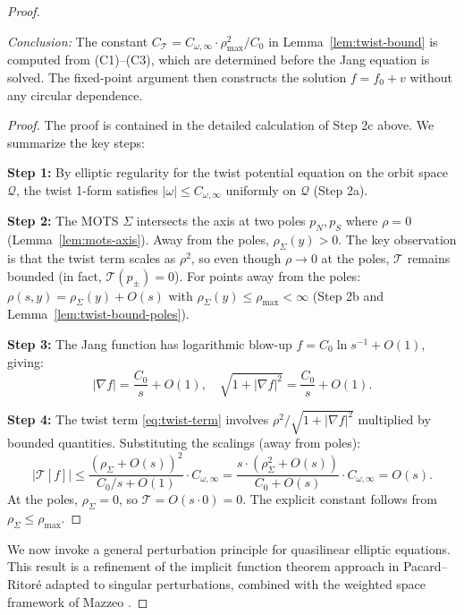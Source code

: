 \begin{proof}
\begin{lemma}
\textit{Conclusion:} The constant $C_\mathcal{T} = C_{\omega,\infty} \cdot \rho_{\max}^2 / C_0$ in Lemma~\ref{lem:twist-bound} is computed from (C1)--(C3), which are determined before the Jang equation is solved. The fixed-point argument then constructs the solution $f = f_0 + v$ without any circular dependence.
\end{lemma}

\begin{proof}
The proof is contained in the detailed calculation of Step 2c above. We summarize the key steps:

\textbf{Step 1:} By elliptic regularity for the twist potential equation on the orbit space $\mathcal{Q}$, the twist 1-form satisfies $|\omega| \leq C_{\omega,\infty}$ uniformly on $\mathcal{Q}$ (Step 2a).

\textbf{Step 2:} The MOTS $\Sigma$ intersects the axis at two poles $p_N, p_S$ where $\rho = 0$ (Lemma~\ref{lem:mots-axis}). Away from the poles, $\rho_\Sigma(y) > 0$. The key observation is that the twist term scales as $\rho^2$, so even though $\rho \to 0$ at the poles, $\mathcal{T}$ remains bounded (in fact, $\mathcal{T}(p_\pm) = 0$). For points away from the poles: $\rho(s, y) = \rho_\Sigma(y) + O(s)$ with $\rho_\Sigma(y) \leq \rho_{\max} < \infty$ (Step 2b and Lemma~\ref{lem:twist-bound-poles}).

\textbf{Step 3:} The Jang function has logarithmic blow-up $f = C_0 \ln s^{-1} + O(1)$, giving:
\[
|\nabla f| = \frac{C_0}{s} + O(1), \quad \sqrt{1 + |\nabla f|^2} = \frac{C_0}{s} + O(1).
\]

\textbf{Step 4:} The twist term \eqref{eq:twist-term} involves $\rho^2 / \sqrt{1 + |\nabla f|^2}$ multiplied by bounded quantities. Substituting the scalings (away from poles):
\[
|\mathcal{T}[f]| \leq \frac{(\rho_\Sigma + O(s))^2}{C_0/s + O(1)} \cdot C_{\omega,\infty} = \frac{s \cdot (\rho_\Sigma^2 + O(s))}{C_0 + O(s)} \cdot C_{\omega,\infty} = O(s).
\]
At the poles, $\rho_\Sigma = 0$, so $\mathcal{T} = O(s \cdot 0) = 0$. The explicit constant follows from $\rho_\Sigma \leq \rho_{\max}$.
\end{proof}

We now invoke a general perturbation principle for quasilinear elliptic equations. This result is a refinement of the implicit function theorem approach in Pacard--Ritor\'e \cite[Theorem 2.1]{pacarditore2003} adapted to singular perturbations, combined with the weighted space framework of Mazzeo \cite[Section 3]{mazzeo1991}.


\end{proof}
